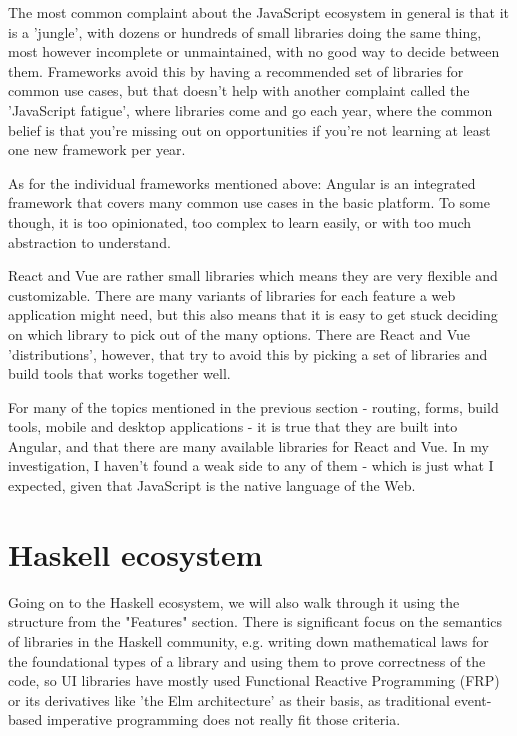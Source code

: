 \documentclass[english,odsaz]{fitthesis}
\begin{document}
The most common complaint about the JavaScript ecosystem in general is that it
is a 'jungle', with dozens or hundreds of small libraries doing the same thing,
most however incomplete or unmaintained, with no good way to decide between
them. Frameworks avoid this by having a recommended set of libraries for common
use cases, but that doesn't help with another complaint called the 'JavaScript
fatigue', where libraries come and go each year, where the common belief is that
you're missing out on opportunities if you're not learning at least one new
framework per year.

As for the individual frameworks mentioned above: Angular is an integrated
framework that covers many common use cases in the basic platform. To some
though, it is too opinionated, too complex to learn easily, or with too much
abstraction to understand.

React and Vue are rather small libraries which means they are very flexible and
customizable. There are many variants of libraries for each feature a web
application might need, but this also means that it is easy to get stuck
deciding on which library to pick out of the many options. There are React and
Vue 'distributions', however, that try to avoid this by picking a set of libraries and
build tools that works together well.

For many of the topics mentioned in the previous section - routing, forms, build
tools, mobile and desktop applications - it is true that they are built into
Angular, and that there are many available libraries for React and Vue.
In my investigation, I haven't found a weak side to any of them - which is just
what I expected, given that JavaScript is the native language of the Web.

\section{Haskell ecosystem}
\label{sec:org17058ab}
Going on to the Haskell ecosystem, we will also walk through it using the
structure from the "Features" section. There is significant focus on the
semantics of libraries in the Haskell community, e.g. writing down mathematical
laws for the foundational types of a library and using them to prove correctness
of the code, so UI libraries have mostly used Functional Reactive Programming
(FRP) or its derivatives like 'the Elm architecture' \cite{loder2018web} as their
basis, as traditional event-based imperative programming does not really fit
those criteria.
\end{document}
